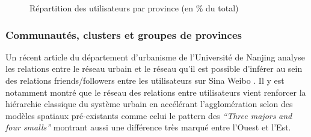 \begin{figure}[H]
    \centering

     

    \caption{
        R\'epartition des utilisateurs par province (en \% du total)
    }

\end{figure}


\subsubsection{Communaut\'es, clusters et groupes de provinces}
Un r\'ecent article du d\'epartement d{\textquoteright}urbanisme de
l{\textquoteright}Universit\'e de Nanjing \citep{Zhen2013} analyse
les relations entre le r\'eseau urbain et le r\'eseau
qu{\textquoteright}il est possible d{\textquoteright}inf\'erer au sein
des relations friends/followers entre les utilisateurs sur Sina Weibo .
Il y est notamment montr\'e que le r\'eseau des relations entre
utilisateurs vient renforcer la hi\'erarchie classique du syst\`eme
urbain en acc\'el\'erant l{\textquoteright}agglom\'eration selon des
mod\`eles spatiaux pr\'e-existants comme celui le pattern des
\textit{{\textquotedblleft}Three majors }\textit{and four
smalls{\textquotedblright} }montrant aussi une diff\'erence tr\`es
marqu\'e entre l{\textquoteright}Ouest et l{\textquoteright}Est.



